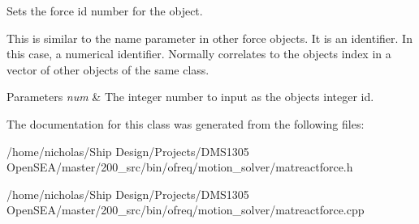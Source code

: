 Sets the force id number for the object. 

This is similar to the name parameter in other force objects. It is an identifier. In this case, a numerical identifier. Normally correlates to the objects index in a vector of other objects of the same class. 
\begin{DoxyParams}{Parameters}
{\em num} & The integer number to input as the objects integer id. \\
\hline
\end{DoxyParams}


The documentation for this class was generated from the following files\-:\begin{DoxyCompactItemize}
\item 
/home/nicholas/\-Ship Design/\-Projects/\-D\-M\-S1305 Open\-S\-E\-A/master/200\-\_\-src/bin/ofreq/motion\-\_\-solver/matreactforce.\-h\item 
/home/nicholas/\-Ship Design/\-Projects/\-D\-M\-S1305 Open\-S\-E\-A/master/200\-\_\-src/bin/ofreq/motion\-\_\-solver/matreactforce.\-cpp\end{DoxyCompactItemize}
